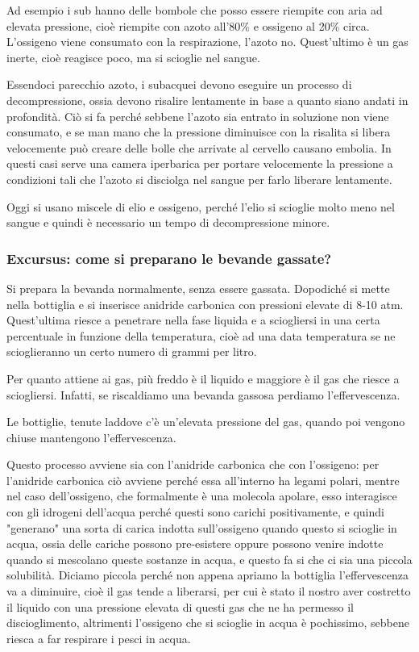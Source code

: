 \vspace{0.4cm}Ad esempio i sub hanno delle bombole che posso essere riempite con aria ad elevata pressione, cioè riempite con azoto all'80\% e ossigeno al 20\% circa. L'ossigeno viene consumato con la respirazione, l'azoto no. Quest'ultimo è un gas inerte, cioè reagisce poco, ma si scioglie nel sangue.

Essendoci parecchio azoto, i subacquei devono eseguire un processo di decompressione, ossia devono risalire lentamente in base a quanto siano andati in profondità. Ciò si fa perché sebbene l'azoto sia entrato in soluzione non viene consumato, e se man mano che la pressione diminuisce con la risalita si libera velocemente può creare delle bolle che arrivate al cervello causano embolia. In questi casi serve una camera iperbarica per portare velocemente la pressione a condizioni tali che l'azoto si disciolga nel sangue per farlo liberare lentamente.

Oggi si usano miscele di elio e ossigeno, perché l'elio si scioglie molto meno nel sangue e quindi è necessario un tempo di decompressione minore.

\subsubsection{Excursus: come si preparano le bevande gassate?}

Si prepara la bevanda normalmente, senza essere gassata. Dopodiché si mette nella bottiglia e si inserisce anidride carbonica con pressioni elevate di 8-10 atm. Quest'ultima riesce a penetrare nella fase liquida e a sciogliersi in una certa percentuale in funzione della temperatura, cioè ad una data temperatura se ne scioglieranno un certo numero di grammi per litro. 

Per quanto attiene ai gas, più freddo è il liquido e maggiore è il gas che riesce a sciogliersi. Infatti, se riscaldiamo una bevanda gassosa perdiamo l'effervescenza.

Le bottiglie, tenute laddove c'è un'elevata pressione del gas, quando poi vengono chiuse mantengono l'effervescenza.

Questo processo avviene sia con l'anidride carbonica che con l'ossigeno: per l'anidride carbonica ciò avviene perché essa all'interno ha legami polari, mentre nel caso dell'ossigeno, che formalmente è una molecola apolare, esso interagisce con gli idrogeni dell'acqua perché questi sono carichi positivamente, e quindi "generano" una sorta di carica indotta sull'ossigeno quando questo si scioglie in acqua, ossia delle cariche possono pre-esistere oppure possono venire indotte quando si mescolano queste sostanze in acqua, e questo fa si che ci sia una piccola solubilità. Diciamo piccola perché non appena apriamo la bottiglia l'effervescenza va a diminuire, cioè il gas tende a liberarsi, per cui è stato il nostro aver costretto il liquido con una pressione elevata di questi gas che ne ha permesso il discioglimento, altrimenti l'ossigeno che si scioglie in acqua è pochissimo, sebbene riesca a far respirare i pesci in acqua.

